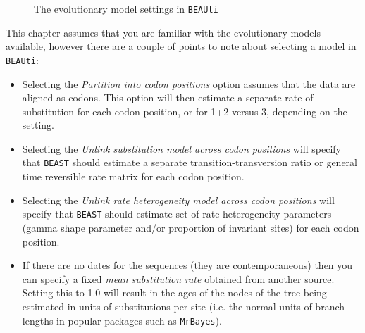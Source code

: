 \documentclass[cup7b, english]{cupbook}
\begin{document}
\begin{figure}[htbp]
\begin{center}
\leavevmode
{}
\end{center}
\caption{The evolutionary model settings in \texttt{BEAUti}}
\label{fig:figure3}
\end{figure}

This chapter assumes that you are familiar with the evolutionary models available, however there are
a couple of points to note about selecting a model in \texttt{BEAUti}:

\begin{itemize}
\item Selecting the {\it Partition into codon positions} option assumes that the data are aligned
as codons. This option will then estimate a separate rate of substitution for each codon position,
or for 1+2 versus 3, depending on the setting.
\item Selecting the {\it Unlink substitution model across codon positions} will specify that \texttt{BEAST}
should estimate a separate transition-transversion ratio or general time reversible rate matrix for
each codon position.
\item Selecting the {\it Unlink rate heterogeneity model across codon positions} will specify that
\texttt{BEAST} should estimate set of rate heterogeneity parameters (gamma shape parameter and/or proportion
of invariant sites) for each codon position.
\item If there are no dates for the sequences (they are contemporaneous) then you can specify a
fixed {\it mean substitution rate} obtained from another source. Setting this to 1.0 will result
in the ages of the nodes of the tree being estimated in units of substitutions per site (i.e. the
normal units of branch lengths in popular packages such as \texttt{MrBayes}).
\end{itemize}
\end{document}
